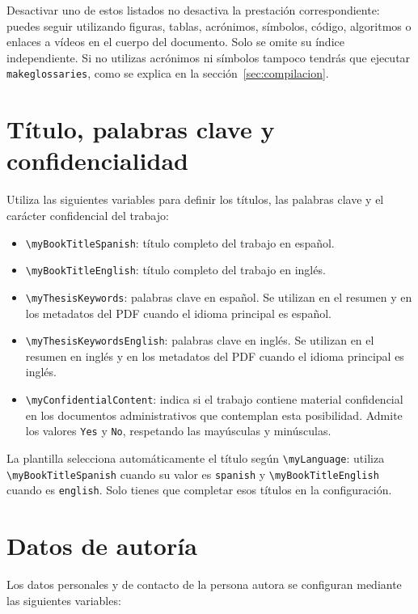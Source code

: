 Desactivar uno de estos listados no desactiva la prestación correspondiente: puedes seguir utilizando figuras, tablas, acrónimos, símbolos, código, algoritmos o enlaces a vídeos en el cuerpo del documento. Solo se omite su índice independiente. Si no utilizas acrónimos ni símbolos tampoco tendrás que ejecutar \texttt{makeglossaries}, como se explica en la sección~\ref{sec:compilacion}.

\section{Título, palabras clave y confidencialidad}

Utiliza las siguientes variables para definir los títulos, las palabras clave y el carácter confidencial del trabajo:

\begin{itemize}
  \item \texttt{\textbackslash{}myBookTitleSpanish}: título completo del trabajo en español.
  \item \texttt{\textbackslash{}myBookTitleEnglish}: título completo del trabajo en inglés.
  \item \texttt{\textbackslash{}myThesisKeywords}: palabras clave en español. Se utilizan en el resumen y en los metadatos del PDF cuando el idioma principal es español.
  \item \texttt{\textbackslash{}myThesisKeywordsEnglish}: palabras clave en inglés. Se utilizan en el resumen en inglés y en los metadatos del PDF cuando el idioma principal es inglés.
  \item \texttt{\textbackslash{}myConfidentialContent}: indica si el trabajo contiene material confidencial en los documentos administrativos que contemplan esta posibilidad. Admite los valores \texttt{Yes} y \texttt{No}, respetando las mayúsculas y minúsculas.
\end{itemize}

La plantilla selecciona automáticamente el título según \texttt{\textbackslash{}myLanguage}: utiliza \texttt{\textbackslash{}myBookTitleSpanish} cuando su valor es \texttt{spanish} y \texttt{\textbackslash{}myBookTitleEnglish} cuando es \texttt{english}. Solo tienes que completar esos títulos en la configuración.

\section{Datos de autoría}

Los datos personales y de contacto de la persona autora se configuran mediante las siguientes variables:

